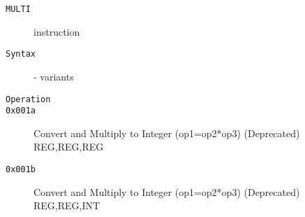 \clearpage
\begin{description}
\item[\texttt{MULTI}] instruction\\
\item[\texttt{Syntax}] - variants\\

\item[\texttt{Operation}]
\item[\texttt{}]
\item[\texttt{0x001a}] Convert and Multiply to Integer (op1=op2*op3) (Deprecated)  {REG,REG,REG}       \\
\item[\texttt{0x001b}] Convert and Multiply to Integer (op1=op2*op3) (Deprecated)  {REG,REG,INT}       \\
\end{description}
\clearpage
